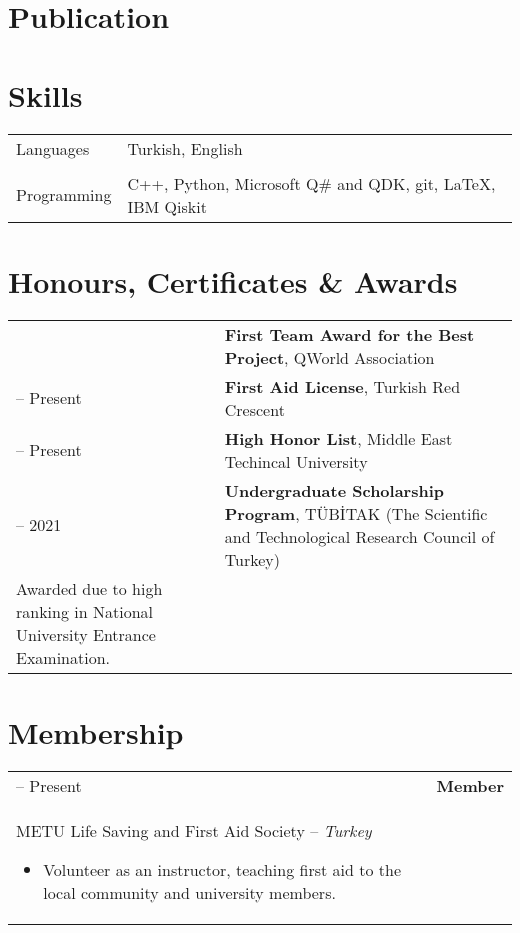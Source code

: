 \documentclass[11pt]{article}
\makeatletter
\newlength{\firstColumnWidth}
\newlength{\tabusep}
\newcommand{\twoNewline}{\tabularnewline & \tabularnewline}
\newenvironment{twocols}
    {
    \begin{longtable}[h]{%
        @{}%
        >{\raggedleft}p{\firstColumnWidth}%
        @{\hspace{\tabusep}}%
        >{\arraybackslash\raggedright}p{\dimexpr %
            \linewidth-\firstColumnWidth-\tabusep%
        \relax}%
        @{}%
        }
    } {
        \end{longtable}
    }
\makeatother
\begin{document}
\section{Publication}


\section{Skills}

\begin{twocols}
    Languages & Turkish, English \twoNewline
    Programming & C++, Python, Microsoft Q\# and QDK, git, \LaTeX, IBM Qiskit
\end{twocols}

\section{Honours, Certificates \& Awards}
\vspace{-.5em}
\renewcommand*{\arraystretch}{1.5}

\begin{twocols}
    2020 & \textbf{First Team Award for the Best Project}, QWorld Association \tabularnewline
    2018 -- Present & \textbf{First Aid License}, Turkish Red Crescent \tabularnewline
    2017 -- Present & \textbf{High Honor List}, Middle East Techincal University \tabularnewline
    2017 -- 2021 & %
        \textbf{Undergraduate Scholarship Program}, TÜBİTAK (The Scientific and Technological Research Council of Turkey)\\
        Awarded due to high ranking in National University Entrance Examination.
\end{twocols}

\section{Membership}
\begin{twocols}
    2018 -- Present & %
    \textbf{Member} \\ 
    METU Life Saving and First Aid Society -- \textit{Turkey}
    \begin{itemize}
        \item Volunteer as an instructor, teaching first aid to the local community and university members.
    \end{itemize}
\end{twocols}
\end{document}
